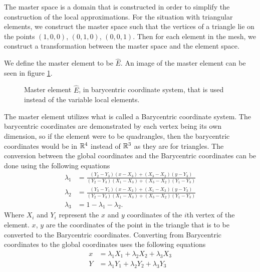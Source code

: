 \documentclass[../fem.tex]{subfile}
\begin{document}
The master space is a domain that is constructed in order to simplify the
construction of the local approximations. For the situation with triangular
elements, we construct the master space such that the vertices of a triangle
lie on the points $(1,0,0)$, $(0,1,0)$, $(0,0,1)$. Then for each element in the
mesh, we construct a transformation between the master space and the element
space.

We define the master element to be $\widehat{E}$. An image of the master
element can be seen in figure \ref{fig:master_element}.

\begin{figure}[htpb]
  \begin{center}
  \end{center}
  \caption{Master element $\widehat{E}$, in barycentric coordinate system, that
  is used instead of the variable local elements.}
  \label{fig:master_element}
\end{figure}

The master element utilizes what is called a Barycentric coordinate system. The
barycentric coordinates are demonstrated by each vertex being its own
dimension, so if the element were to be quadrangles, then the barycentric
coordinates would be in $\mathbb{R}^4$ instead of $\mathbb{R}^3$ as they are for triangles. The
conversion between the global coordinates and the Barycentric coordinates can
be done using the following equations
\begin{align*}
  \lambda_1&=\frac{(Y_2-Y_3)(x-X_3)+(X_3-X_2)(y-Y_3)}{(Y_2-Y_3)(X_1-X_3)+(X_3-X_2)(Y_1-Y_3)}\\
  \lambda_2&=\frac{(Y_3-Y_1)(x-X_3)+(X_1-X_3)(y-Y_3)}{(Y_2-Y_3)(X_1-X_3)+(X_3-X_2)(Y_1-Y_3)}\\
  \lambda_3&=1-\lambda_1-\lambda_2.
\end{align*}
Where $X_i$ and $Y_i$ represent the $x$ and $y$ coordinates of the $i$th vertex
of the element. $x$, $y$ are the coordinates of the point in the triangle that
is to be converted to the Barycentric coordinates. Converting from Barycentric
coordinates to the global coordinates uses the following equations
\begin{align*}
  x&=\lambda_1X_1+\lambda_2X_2+\lambda_3X_3\\
  Y&=\lambda_1Y_1+\lambda_2Y_2+\lambda_3Y_3
\end{align*}
\end{document}
